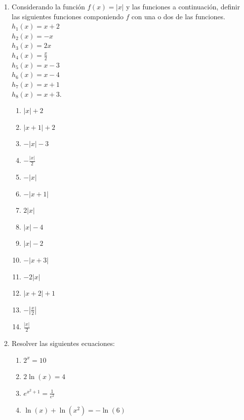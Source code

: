\documentclass[a4paper]{article}
\newcommand{\exercise}{\item}
\begin{document}
\begin{enumerate}
	\exercise Considerando la función $f(x)=|x|$ y las funciones a continuación, definir las siguientes funciones componiendo $f$ con una o dos de las funciones. \\ $h_1(x)=x+2$ \\ $h_2(x)=-x$ \\ $h_3(x)=2x$ \\ $h_4(x)=\displaystyle\frac{x}{2}$ \\ $h_5(x)=x-3$ \\ $h_6(x)=x-4$ \\ $h_7(x)=x+1$ \\ $h_8(x)=x+3$.
	\begin{enumerate} [label=(\alph*)]
		\item $|x|+2$
		\item $|x+1|+2$
		\item $-|x|-3$
		\item $-\displaystyle\frac{|x|}{2}$
		\item $-|x|$
		\item $-|x+1|$
		\item $2|x|$
		\item $|x|-4$
		\item $|x|-2$
		\item $-|x+3|$
		\item $-2|x|$
		\item $|x+2|+1$
		\item $-\left|\displaystyle\frac{x}{2}\right|$
		\item $\displaystyle\frac{|x|}{2}$
	\end{enumerate}

	\exercise Resolver las siguientes ecuaciones:
	\begin{enumerate} [label=(\alph*)]
		\item $2^x=10$
		\item $2\ln(x)=4$
		\item $e^{x^2+1}=\displaystyle{\frac{1}{e^2}}$
		\item $\ln(x)+\ln(x^2)=-\ln(6)$
	\end{enumerate}


\end{enumerate}
\end{document}
